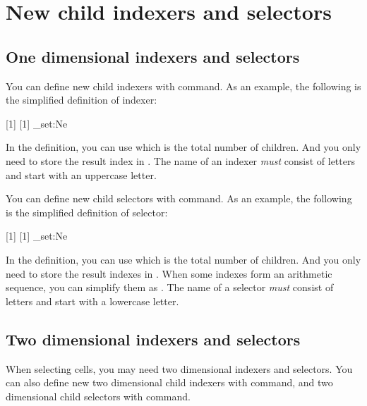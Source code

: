 \documentclass[oneside]{book}
\renewcommand\emph[1]{\textit{\color{red3}#1}}
\begin{document}
{\section{New child indexers and selectors}
\label{sect:newchild}

\subsection{One dimensional indexers and selectors}

You can define new child indexers with \CC{\NewTblrChildIndexer} command.
As an example, the following is the simplified definition of  indexer:
\begin{codehigh}[language=latex/latex3]
\ExplSyntaxOn
{} [1] [1]
  {
    \tl_set:Ne 
  }
\ExplSyntaxOff
\end{codehigh}
In the definition, you can use \CC{\lTblrChildTotalInt} which is the total number of children.
And you only need to store the result index  in \CC{\lTblrChildIndexTl}.
The name of an indexer \emph{must} consist of letters and start with an uppercase letter.

You can define new child selectors with \CC{\NewTblrChildSelector} command.
As an example, the following is the simplified definition of  selector:
\begin{codehigh}[language=latex/latex3]
\ExplSyntaxOn
{} [1] [1]
  {
    \clist_set:Ne 
  }
\ExplSyntaxOff
\end{codehigh}
In the definition, you can use \CC{\lTblrChildTotalInt} which is the total number of children.
And you only need to store the result indexes in \CC{\lTblrChildClist}.
When some indexes form an arithmetic sequence,
you can simplify them as .
The name of a selector \emph{must} consist of letters and start with a lowercase letter.

\subsection{Two dimensional indexers and selectors}

When selecting cells, you may need two dimensional indexers and selectors.
You can also define new two dimensional child indexers with \CC{\NewTblrChildIndexer} command,
and two dimensional child selectors with \CC{\NewTblrChildSelector} command.

}
\end{document}
